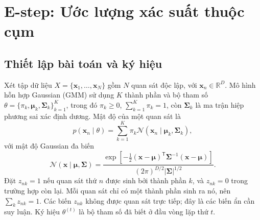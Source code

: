 \section{E-step: Ước lượng xác suất thuộc cụm}
\label{sec:estep}

\subsection{Thiết lập bài toán và ký hiệu}
Xét tập dữ liệu $X=\{\mathbf{x}_1,\ldots,\mathbf{x}_N\}$ gồm $N$ quan sát độc lập, với $\mathbf{x}_n\in\mathbb{R}^D$. Mô hình hỗn hợp Gaussian (GMM) sử dụng $K$ thành phần và bộ tham số $\theta=\{\pi_k,\boldsymbol{\mu}_k,\boldsymbol{\Sigma}_k\}_{k=1}^K$, trong đó $\pi_k\geq 0$, $\sum_{k=1}^K\pi_k=1$, còn $\boldsymbol{\Sigma}_k$ là ma trận hiệp phương sai xác định dương. Mật độ của một quan sát là
\begin{equation}
p(\mathbf{x}_n\mid\theta)=\sum_{k=1}^K\pi_k\mathcal{N}(\mathbf{x}_n\mid\boldsymbol{\mu}_k,\boldsymbol{\Sigma}_k),
\end{equation}
với mật độ Gaussian đa biến
\begin{equation}
\mathcal{N}(\mathbf{x}\mid\boldsymbol{\mu},\boldsymbol{\Sigma})
=\frac{\exp\!\left[-\frac12(\mathbf{x}-\boldsymbol{\mu})^{\mathsf T}\boldsymbol{\Sigma}^{-1}(\mathbf{x}-\boldsymbol{\mu})\right]}{(2\pi)^{D/2}|\boldsymbol{\Sigma}|^{1/2}}.
\end{equation}
Đặt $z_{nk}=1$ nếu quan sát thứ $n$ được sinh bởi thành phần $k$, và $z_{nk}=0$ trong trường hợp còn lại. Mỗi quan sát chỉ có một thành phần sinh ra nó, nên $\sum_k z_{nk}=1$. Các biến $z_{nk}$ không được quan sát trực tiếp; đây là các biến ẩn cần suy luận. Ký hiệu $\theta^{(t)}$ là bộ tham số đã biết ở đầu vòng lặp thứ $t$.

